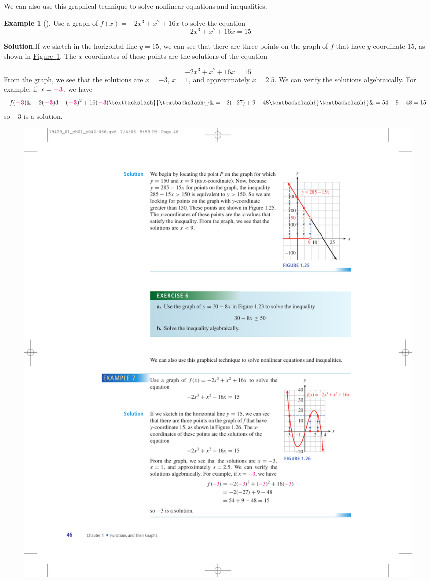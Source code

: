 \documentclass[10pt,]{book}
\theoremstyle{plain}
\theoremstyle{definition}
\theoremstyle{definition}
\newtheorem{example}[theorem]{Example}
\theoremstyle{definition}
\theoremstyle{definition}
\numberwithin{equation}{part}
\newcommand{\alert}[1]{\boldsymbol{\color{magenta}{#1}}}
\begin{document}
We can also use this graphical technique to solve nonlinear equations and inequalities.%
\begin{example}[]\label{example-graph-to-solve-cubic}
Use a graph of \(f(x) = -2x^3 + x^2 + 16x\) to solve the equation%
\begin{equation*}
-2x^3 + x^2 + 16x = 15
\end{equation*}
%
\par\medskip\noindent%
\textbf{Solution.}\quad If we sketch in the horizontal line \(y = 15\), we can see that there are three points on the graph of \(f\) that have \(y\)-coordinate \(15\), as shown in \hyperref[fig-graph-to-solve-cubic]{Figure~\ref{fig-graph-to-solve-cubic}}. The \(x\)-coordinates of these points are the solutions of the equation%
\par
%
\begin{equation*}
-2x^3 + x^2 + 16x = 15
\end{equation*}
From the graph, we see that the solutions are \(x = -3\), \(x = 1\), and approximately \(x = 2.5\). We can verify the solutions algebraically. For example, if \(x = \alert{-3}\), we have \begin{align*} f(\alert{-3})\&-2(\alert{-3})3 + (\alert{-3})^2 + 16(\alert{-3})\textbackslash{}\textbackslash{} \&= -2(-27) + 9 - 48\textbackslash{}\textbackslash{} \&=54 + 9 - 48 = 15 \end{align*} so \(-3\) is a solution.%
\begin{figure}
\centering
\includegraphics[width=0.6\linewidth]{images/fig-graph-to-solve-cubic}
\caption{\label{fig-graph-to-solve-cubic}}
\end{figure}
\end{example}
\end{document}
